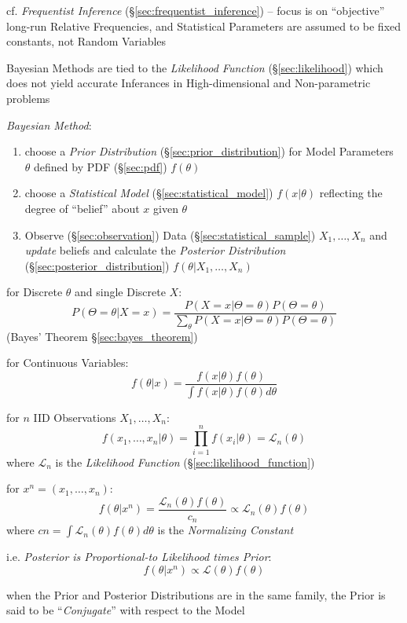 cf. \emph{Frequentist Inference} (\S\ref{sec:frequentist_inference}) -- focus is
on ``objective'' long-run Relative Frequencies, and Statistical Parameters are
assumed to be fixed constants, not Random Variables

\fist Bayesian Methods are tied to the \emph{Likelihood Function}
(\S\ref{sec:likelihood}) which does not yield accurate Inferances in
High-dimensional and Non-parametric problems

\emph{Bayesian Method}:
\begin{enumerate}
  \item choose a \emph{Prior Distribution} (\S\ref{sec:prior_distribution}) for
    Model Parameters $\theta$ defined by PDF (\S\ref{sec:pdf}) $f(\theta)$
  \item choose a \emph{Statistical Model} (\S\ref{sec:statistical_model})
    $f(x|\theta)$ reflecting the degree of ``belief'' about $x$ given $\theta$
  \item Observe (\S\ref{sec:observation}) Data (\S\ref{sec:statistical_sample})
    $X_1, \ldots, X_n$ and \emph{update} beliefs and calculate the
    \emph{Posterior Distribution} (\S\ref{sec:posterior_distribution})
    $f(\theta | X_1, \ldots, X_n)$
\end{enumerate}

for Discrete $\theta$ and single Discrete $X$:
\[
  P(\Theta = \theta | X = x) = \frac{
    P(X = x|\Theta = \theta)P(\Theta = \theta)
  }{
    \sum_\theta P(X = x | \Theta = \theta) P(\Theta = \theta)
  }
\]
(Bayes' Theorem \S\ref{sec:bayes_theorem})

for Continuous Variables:
\[
  f(\theta | x) = \frac{
    f(x|\theta)f(\theta)
  }{
    \int f(x|\theta)f(\theta) d\theta
  }
\]

for $n$ IID Observations $X_1, \ldots, X_n$:
\[
  f(x_1, \ldots, x_n | \theta) =
    \prod_{i=1}^n f(x_i | \theta) = \mathcal{L}_n(\theta)
\]
where $\mathcal{L}_n$ is the \emph{Likelihood Function}
(\S\ref{sec:likelihood_function})

for $x^n = (x_1, \ldots, x_n)$:
\[
  f(\theta|x^n) = \frac{\mathcal{L}_n(\theta)f(\theta)}{c_n}
    \propto \mathcal{L}_n(\theta)f(\theta)
\]
where $cn = \int \mathcal{L}_n(\theta)f(\theta) d\theta$ is the
\emph{Normalizing Constant}

i.e. \emph{Posterior is Proportional-to Likelihood times Prior}:
\[
  f(\theta | x^n) \propto \mathcal{L}(\theta)f(\theta)
\]

when the Prior and Posterior Distributions are in the same family, the Prior is
said to be ``\emph{Conjugate}'' with respect to the Model

